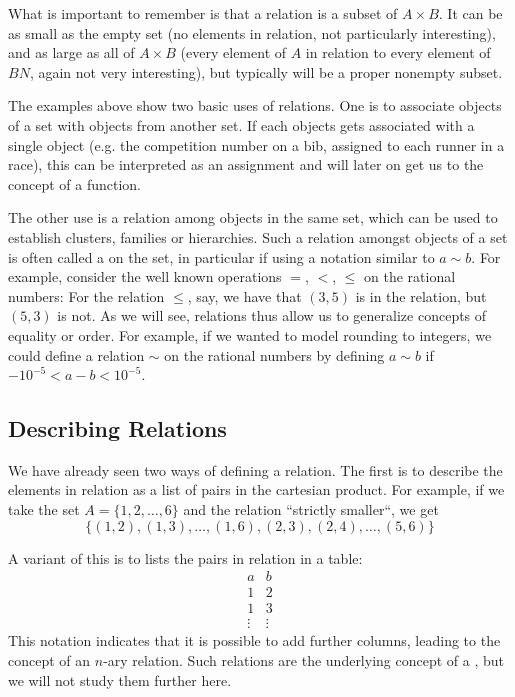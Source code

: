 What is important to remember is that a relation is a subset of $A\times B$.
It can be as small as the empty set (no elements in relation, not
particularly interesting), and as large as all of $A\times B$ (every element
of $A$ in relation to every element of $BN$, again not very interesting),
but typically will be a proper nonempty subset.
\medskip

The examples above show two basic uses of relations. One is to associate objects
of a set with objects from another set. If each objects gets associated with
a single object (e.g. the competition number on a bib, assigned to each runner
in a race), this can be interpreted as an assignment and will later on get
us to the concept of a function.

The other use is a relation among objects in the same set, which can be used
to establish clusters, families or hierarchies. Such a relation amongst
objects of a set is often called a  on the set, in
particular if using a notation similar to $a\sim b$.  For example, consider
the well known operations $=$, $<$, $\le$ on the rational numbers: For the
relation $\le$, say, we have that $(3,5)$ is in the relation, but $(5,3)$ is
not. As we will see, relations thus allow us to generalize concepts of
equality or order. For example, if we wanted to model rounding to integers,
we could define a relation $\sim$ on the rational numbers by
defining $a\sim b$ if $-10^{-5}<a-b<10^{-5}$.

\subsection{Describing Relations}
\label{descrel}

We have already seen two ways of defining a relation. The first is to
describe the elements in relation as a list of pairs in the cartesian
product. For example, if we take the set $A=\{1,2,\ldots,6\}$ and the
relation ``strictly smaller``, we get
\[
\{(1,2),(1,3),\ldots,(1,6),(2,3),(2,4),\ldots,(5,6) \}
\]

A variant of this is to lists the pairs in relation in a table:
\[
\begin{array}{c|c}
a&b\\
\hline
1&2\\
1&3\\
\vdots&\vdots
\end{array} 
\]
This notation indicates that it is possible to add further columns, leading
to the concept of an $n$-ary relation. Such relations are the underlying
concept of a , but we will not study them
further here.
\smallskip

